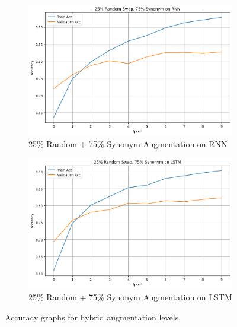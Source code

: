 \documentclass[10pt]{extarticle}
\begin{document}
\begin{figure}[ht]
  \centering
  \begin{subfigure}[b]{0.45\textwidth}
    \includegraphics[width=\textwidth]{img/random_25_synonym_75_rnn.png}
    \caption{25\% Random + 75\% Synonym Augmentation on RNN}
    \label{fig:random_25_synonym_75_rnn}
  \end{subfigure}
  \hfill
  \begin{subfigure}[b]{0.45\textwidth}
    \includegraphics[width=\textwidth]{img/random_25_synonym_75_lstm.png}
    \caption{25\% Random + 75\% Synonym Augmentation on LSTM}
    \label{fig:random_25_synonym_75_lstm}
  \end{subfigure}
  \caption{Accuracy graphs for hybrid augmentation levels.}
  \label{fig:hybrid_extreme_substitution_acc_2575}
\end{figure}
\end{document}

